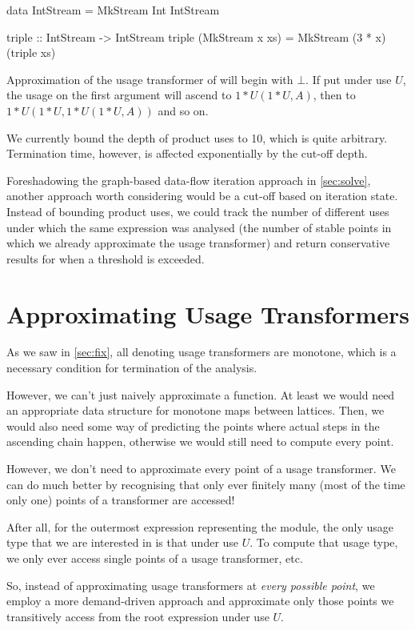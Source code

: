 \begin{haskellcode}
  data IntStream = MkStream Int IntStream

  triple :: IntStream -> IntStream
  triple (MkStream x xs) = MkStream (3 * x) (triple xs)
\end{haskellcode}

Approximation of the usage transformer of  will begin with $\bot$. If put under use $U$, the usage on the first argument will ascend to $1*U(1*U, A)$, then to $1*U(1*U, 1*U(1*U, A))$ and so on.

We currently bound the depth of product uses to 10, which is quite arbitrary. 
Termination time, however, is affected exponentially by the cut-off depth.

Foreshadowing the graph-based data-flow iteration approach in \cref{sec:solve}, another approach worth considering would be a cut-off based on iteration state.
Instead of bounding product uses, we could track the number of different uses under which the same expression was analysed (\eg the number of stable points in which we already approximate the usage transformer) and return conservative results for when a threshold is exceeded.

\section{Approximating Usage Transformers}\label{sec:approx}

As we saw in \cref{sec:fix}, all denoting usage transformers are monotone, which is a necessary condition for termination of the analysis.

However, we can't just naively approximate a function.
At least we would need an appropriate data structure for monotone maps between lattices.
Then, we would also need some way of predicting the points where actual steps in the ascending chain happen, otherwise we would still need to compute every point.

However, we don't need to approximate every point of a usage transformer.
We can do much better by recognising that only ever finitely many (most of the time only one) points of a transformer are accessed!

After all, for the outermost  expression representing the module, the only usage type that we are interested in is that under use $U$.
To compute that usage type, we only ever access single points of a usage transformer, etc.

So, instead of approximating usage transformers at \emph{every possible point}, we employ a more demand-driven approach and approximate only those points we transitively access from the root expression under use $U$.


